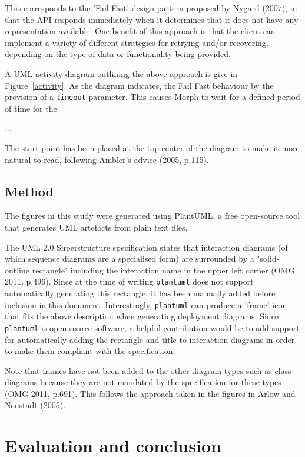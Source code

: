 \documentclass{article}
\begin{document}
This corresponds to the 'Fail Fast' design pattern proposed by Nygard (2007), in that the API responds immediately when it determines that it does not have any representation available. One benefit of this approach is that the client can implement a variety of different strategies for retrying and/or recovering, depending on the type of data or functionality being provided.

A UML activity diagram outlining the above approach is give in Figure~\ref{activity}. As the diagram indicates, the Fail Fast behaviour by the provision of a \texttt{timeout} parameter. This causes Morph to wait for a defined period of time for the 

...

The start point has been placed at the top center of the diagram to make it more natural to read, following Ambler's advice (2005, p.115).

\subsection{Method}

The figures in this study were generated using PlantUML, a free open-source tool\cite{plantuml} that generates UML artefacts from plain text files.

The UML 2.0 Superstructure specification states that interaction diagrams (of which sequence diagrams are a specialised form) are surrounded by a "solid-outline rectangle" including the interaction name in the upper left corner (OMG 2011, p.496). Since at the time of writing \texttt{plantuml} does not support automatically generating this rectangle, it has been manually added before inclusion in this document. Interestingly, \texttt{plantuml} can produce a 'frame' icon that fits the above description when generating deployment diagrams. Since \texttt{plantuml} is open source software, a helpful contribution would be to add support for automatically adding the rectangle and title to interaction diagrams in order to make them compliant with the specification. 

Note that frames have not been added to the other diagram types such as class diagrams because they are not mandated by the specification for these types (OMG 2011, p.691). This follows the approach taken in the figures in Arlow and Neustadt (2005).

\section{Evaluation and conclusion}
\end{document}

